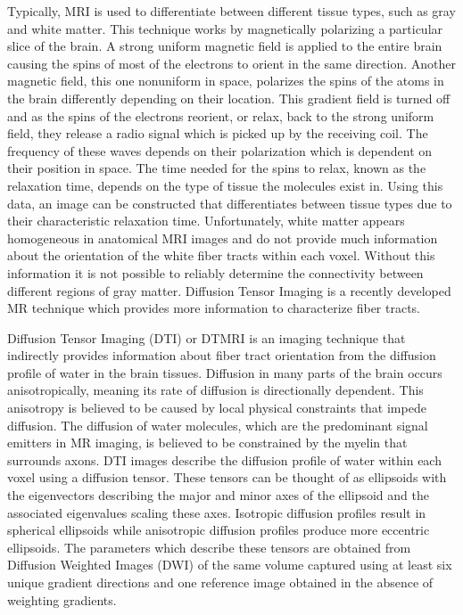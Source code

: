 Typically, MRI is used to differentiate between different tissue types, such as gray and white matter.  This technique works by magnetically polarizing a particular slice of the brain.  A strong uniform magnetic field is applied to the entire brain causing the spins of most of the electrons to orient in the same direction.  Another magnetic field, this one nonuniform in space, polarizes the spins of the atoms in the brain differently depending on their location.  This gradient field is turned off and as the spins of the electrons reorient, or relax, back to the strong uniform field, they release a radio signal which is picked up by the receiving coil.  The frequency of these waves depends on their polarization which is dependent on their position in space.  The time needed for the spins to relax, known as the relaxation time, depends on the type of tissue the molecules exist in.  Using this data, an image can be constructed that differentiates between tissue types due to their characteristic relaxation time. Unfortunately, white matter appears homogeneous in anatomical MRI images and do not provide much information about the orientation of the white fiber tracts within each voxel.  Without this information it is not possible to reliably determine the connectivity between different regions of gray matter.  Diffusion Tensor Imaging is a recently developed MR technique which provides more information to characterize fiber tracts.

Diffusion Tensor Imaging (DTI) or DTMRI is an imaging technique that indirectly provides information about fiber tract orientation from the diffusion profile of water in the brain tissues. Diffusion in many parts of the brain occurs anisotropically, meaning its rate of diffusion is directionally dependent.  This anisotropy is believed to be caused by local physical constraints that impede diffusion.  The diffusion of water molecules, which are the predominant signal emitters in MR imaging, is believed to be constrained by the myelin that surrounds axons.  DTI images describe the diffusion profile of water within each voxel using a diffusion tensor.  These tensors can be thought of as ellipsoids with the eigenvectors describing the major and minor axes of the ellipsoid and the associated eigenvalues scaling these axes.  Isotropic diffusion profiles result in spherical ellipsoids while anisotropic diffusion profiles produce more eccentric ellipsoids.  The parameters which describe these tensors are obtained from Diffusion Weighted Images (DWI) of the same volume captured using at least six unique gradient directions and one reference image obtained in the absence of weighting gradients.


